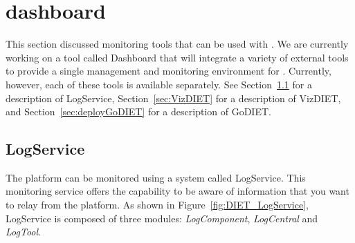 
\chapter{\diet dashboard}
\label{ch:dashboard}

This section discussed monitoring tools that can be used with \diet.  We are
currently working on a tool called \diet Dashboard that will integrate a
variety of external tools to provide a single management and monitoring
environment for \diet.  Currently, however, each of these tools is available
separately.  See Section~\ref{sec:LogService} for a description of LogService,
Section~\ref{sec:VizDIET} for a description of VizDIET, and
Section~\ref{sec:deployGoDIET} for a description of GoDIET.

\section{LogService}
\label{sec:LogService}

The \diet platform can be monitored using a system called LogService. 
This monitoring service offers the capability to be aware of information that
you want to relay from the platform.  As shown in
Figure~\ref{fig:DIET_LogService}, LogService is composed of three modules:
\textit{LogComponent}, \textit{LogCentral} and \textit{LogTool}.

